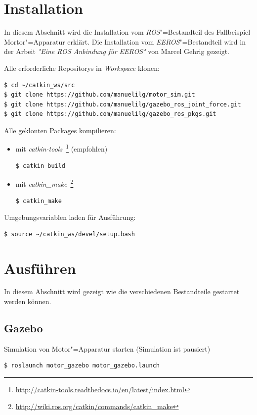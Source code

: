 \section{Installation}
In diesem Abschnitt wird die Installation vom \textit{ROS}"=Bestandteil des Fallbeispiel Mortor"=Apparatur erklärt.
Die Installation vom \textit{EEROS}"=Bestandteil wird in der Arbeit \textit{\textit{"}Eine ROS Anbindung für EEROS\textit{"}} von Marcel Gehrig gezeigt.

Alle erforderliche Repositorys in \textit{Workspace} klonen:
\begin{lstlisting}
$ cd ~/catkin_ws/src
$ git clone https://github.com/manuelilg/motor_sim.git
$ git clone https://github.com/manuelilg/gazebo_ros_joint_force.git
$ git clone https://github.com/manuelilg/gazebo_ros_pkgs.git
\end{lstlisting} 

Alle geklonten Packages kompilieren:
\begin{itemize}
\item mit \textit{catkin-tools}~\footnote{\url{http://catkin-tools.readthedocs.io/en/latest/index.html}} (empfohlen)
\begin{lstlisting}
$ catkin build
\end{lstlisting}
\item mit \textit{catkin\_make}~\footnote{\url{http://wiki.ros.org/catkin/commands/catkin\_make}}
\begin{lstlisting}
$ catkin_make
\end{lstlisting}
\end{itemize}

Umgebungsvariablen laden für Ausführung:
\begin{lstlisting}
$ source ~/catkin_ws/devel/setup.bash
\end{lstlisting}

\section{Ausführen}
In diesem Abschnitt wird gezeigt wie die verschiedenen Bestandteile gestartet werden können.
\subsection{Gazebo}
Simulation von Motor"=Apparatur starten (Simulation ist pausiert)
\begin{lstlisting}
$ roslaunch motor_gazebo motor_gazebo.launch
\end{lstlisting}

